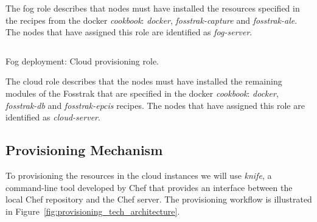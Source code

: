 The fog role describes that nodes must have installed the resources specified in the
recipes from the docker \textit{cookbook}: \textit{docker}, \textit{fosstrak-capture} and
\textit{fosstrak-ale}. The nodes that have assigned this role are identified as \textit{fog-server}.

\begin{listing}[ht!]
  \inputminted[frame=lines,
                 framesep=3mm,
                 linenos=true,
                 xleftmargin=21pt,
                 tabsize=4]{json}{./listings/cloud_role.json}
  \caption{Fog deployment: Cloud provisioning role.}
  \label{listing:fog_cloud_recipe}
\end{listing}

The cloud role describes that the nodes must have installed the remaining modules of the Fosstrak
that are specified in the docker \textit{cookbook}: \textit{docker}, \textit{fosstrak-db} and
\textit{fosstrak-epcis} recipes. The nodes that have assigned this role are identified as
\textit{cloud-server}.

\subsection{Provisioning Mechanism}
\label{sub:provisioning_mechanism}
To provisioning the resources in the cloud instances we will use \textit{knife}, a command-line tool
developed by Chef that provides an interface between the local Chef repository and the Chef server.
The provisioning workflow is illustrated in Figure~\ref{fig:provisioning_tech_architecture}.\\

